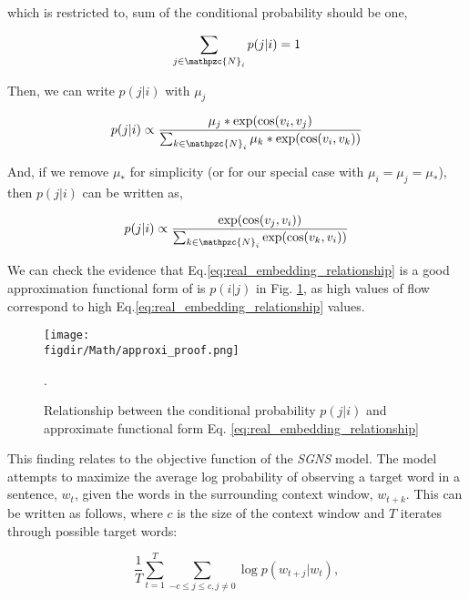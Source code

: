 \documentclass[12pt]{article} %
\def\figdir{../Figs}
\def\SGNS{\textit{SGNS}}
\begin{document}
which is restricted to, sum of the conditional probability should be one,

\begin{equation}
    \label{eq:sum of the conditional probabiitliy}
    \sum_{j\in\mathpzc{N}_i} p(j|i) = 1
\end{equation}

Then, we can write $p(j|i)$ with $\mu_{j}$

\begin{equation}
    p(j|i) \propto \frac{{\mu_j}* \exp(\cos(v_i,v_j)}{\sum_{k\in\mathpzc{N}_i} {\mu_k}* \exp(\cos(v_i,v_k))}
\end{equation}

And, if we remove ${\mu_*}$ for simplicity (or for our special case with $\mu_{i} = \mu_{j} = \mu_*$), then $p(j|i)$ can be written as,

\begin{equation}
    \label{eq:real_embedding_relationship}
    p(j|i) \propto \frac{\exp(\cos(v_j, v_i))}{\sum_{k\in\mathpzc{N}_i} \exp(\cos(v_k,v_i))}
\end{equation}

We can check the evidence that Eq.\ref{eq:real_embedding_relationship} is a good approximation functional form of is $p(i|j)$ in Fig. \ref{fig:real_embedding_relationship}, as high values of flow correspond to high Eq.\ref{eq:real_embedding_relationship} values.

%
%
\begin{figure}
    \centering
    \texttt{[image: \\figdir/Math/approxi\_proof.png]}
    \caption{Relationship between the conditional probability $p(j|i)$ and approximate functional form Eq. \ref{eq:real_embedding_relationship}}.
    \label{fig:real_embedding_relationship}
\end{figure}

This finding relates to the objective function of the \SGNS{} model. The model attempts to maximize the average log probability of observing a target word in a sentence, $w_{t}$, given the words in the surrounding context window, $w_{t + k}$. This can be written as follows, where $c$ is the size of the context window and $T$ iterates through possible target words:

\begin{equation}
    \label{eq:skipgram_log_prob_condensed}
    \frac{1}{T}\sum_{t=1}^{T} \sum_{-c \le j \le c, j \neq 0} \log p(w_{t+j}|w_t),  
\end{equation}
\end{document}
